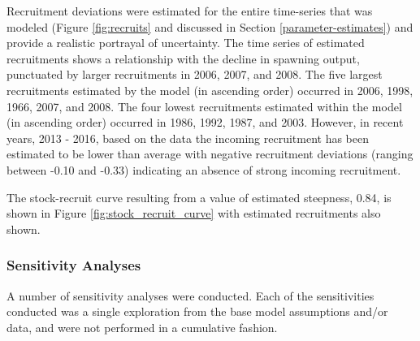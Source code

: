 \documentclass[12pt,]{article}
\begin{document}
Recruitment deviations were estimated for the entire time-series that
was modeled (Figure \ref{fig:recruits} and discussed in Section
\ref{parameter-estimates}) and provide a realistic portrayal of
uncertainty. The time series of estimated recruitments shows a
relationship with the decline in spawning output, punctuated by larger
recruitments in 2006, 2007, and 2008. The five largest recruitments
estimated by the model (in ascending order) occurred in 2006, 1998,
1966, 2007, and 2008. The four lowest recruitments estimated within the
model (in ascending order) occurred in 1986, 1992, 1987, and 2003.
However, in recent years, 2013 - 2016, based on the data the incoming
recruitment has been estimated to be lower than average with negative
recruitment deviations (ranging between -0.10 and -0.33) indicating an
absence of strong incoming recruitment.

The stock-recruit curve resulting from a value of estimated steepness,
0.84, is shown in Figure \ref{fig:stock_recruit_curve} with estimated
recruitments also shown.

\subsubsection{Sensitivity Analyses}\label{sensitivity-analyses}

A number of sensitivity analyses were conducted. Each of the
sensitivities conducted was a single exploration from the base model
assumptions and/or data, and were not performed in a cumulative fashion.
\end{document}
